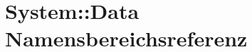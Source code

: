 \hypertarget{namespaceSystem_1_1Data}{
\section{System::Data Namensbereichsreferenz}
\label{namespaceSystem_1_1Data}
}




